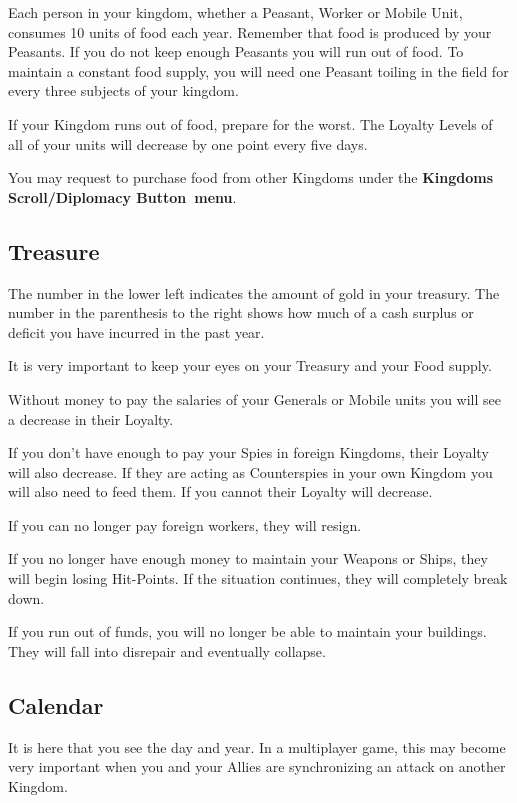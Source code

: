 Each person in your kingdom, whether a Peasant, Worker or Mobile Unit, consumes 10 units of food each year. Remember that food is produced by your Peasants. If you do not keep enough Peasants you will run out of food. To maintain a constant food supply, you will need one Peasant toiling in the field for every three subjects of your kingdom.

If your Kingdom runs out of food, prepare for the worst. The Loyalty Levels of all of your units will decrease by one point every five days.

You may request to purchase food from other Kingdoms under the \textbf{Kingdoms Scroll/Diplomacy Button menu}.

\subsection{Treasure}


The number in the lower left indicates the amount of gold in your treasury. The number in the parenthesis to the right shows how much of a cash surplus or deficit you have incurred in the past year.

It is very important to keep your eyes on your Treasury and your Food supply.

Without money to pay the salaries of your Generals or Mobile units you will see a decrease in their Loyalty.

If you don’t have enough to pay your Spies in foreign Kingdoms, their Loyalty will also decrease. If they are acting as Counterspies in your own Kingdom you will also need to feed them. If you cannot their Loyalty will decrease.

If you can no longer pay foreign workers, they will resign.

If you no longer have enough money to maintain your Weapons or Ships, they will begin losing Hit-Points. If the situation continues, they will completely break down.

If you run out of funds, you will no longer be able to maintain your buildings. They will fall into disrepair and eventually collapse.

\subsection{Calendar}


It is here that you see the day and year. In a multiplayer game, this may become very important when you and your Allies are synchronizing an attack on another Kingdom.


